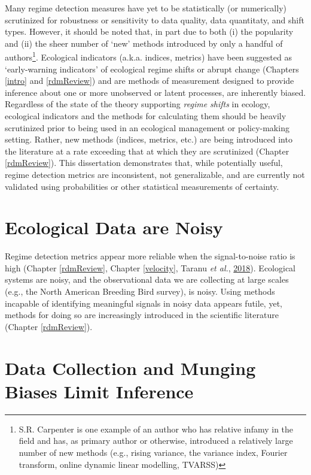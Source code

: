 \documentclass[print]{nuthesis}
\begin{document}
Many regime detection measures have yet to be statistically (or numerically) scrutinized for robustness or sensitivity to data quality, data quantitaty, and shift types. However, it should be noted that, in part due to both (i) the popularity and (ii) the sheer number of `new' methods introduced by only a handful of authors\footnote{S.R. Carpenter is one example of an author who has relative infamy in the field and has, as primary author or otherwise, introduced a relatively large number of new methods (e.g., rising variance, the variance index, Fourier transform, online dynamic linear modelling, TVARSS)}. Ecological indicators (a.k.a. indices, metrics) have been suggested as `early-warning indicators' of ecological regime shifts or abrupt change (Chapters \ref{intro} and \ref{rdmReview}) and are methods of measurement designed to provide inference about one or more unobserved or latent processes, are inherently biased. Regardless of the state of the theory supporting \emph{regime shifts} in ecology, ecological indicators and the methods for calculating them should be heavily scrutinized prior to being used in an ecological management or policy-making setting. Rather, new methods (indices, metrics, etc.) are being introduced into the literature at a rate exceeding that at which they are scrutinized (Chapter \ref{rdmReview}). This dissertation demonstrates that, while potentially useful, regime detection metrics are inconsistent, not generalizable, and are currently not validated using probabilities or other statistical measurements of certainty.

\hypertarget{ecological-data-are-noisy}{%
\section{Ecological Data are Noisy}\label{ecological-data-are-noisy}}

Regime detection metrics appear more reliable when the signal-to-noise ratio is high (Chapter \ref{rdmReview}, Chapter \ref{velocity}, Taranu \emph{et al.}, \protect\hyperlink{ref-taranu2018can}{2018}). Ecological systems are noisy, and the observational data we are collecting at large scales (e.g., the North American Breeding Bird survey), is noisy. Using methods incapable of identifying meaningful signals in noisy data appears futile, yet, methods for doing so are increasingly introduced in the scientific literature (Chapter \ref{rdmReview}).

\hypertarget{data-collection-and-munging-biases-limit-inference}{%
\section{Data Collection and Munging Biases Limit Inference}\label{data-collection-and-munging-biases-limit-inference}}
\end{document}
